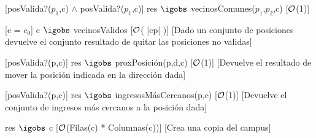 \begin{Interfaz}
	[posValida?($p_1$,c) $\land$ posValida?($p_1$,c)]
	{res $\igobs$ vecinosComunes($p_1$,$p_2$,c)}
	[$\mathcal{O}$(1)]
	
	[c = $c_0$]
	{c $\igobs$ vecinosValidos}
	[$\mathcal{O}$( |cp| )]
	[Dado un conjunto de posiciones devuelve el conjunto resultado de quitar las posiciones no validas]
	
	[posValida?(p,c)]
	{res $\igobs$ proxPosición(p,d,c)}
	[$\mathcal{O}$(1)]
	[Devuelve el resultado de mover la posición indicada en la dirección dada]
		
	[posValida?(p,c)]
	{res $\igobs$ ingresosMásCercanos(p,c)}
	[$\mathcal{O}$(1)]
	[Devuelve el conjunto de ingresos más cercanos a la posición dada]
	
	{res $\igobs$ c}
	[$\mathcal{O}$(Filas(c) * Columnas(c))]
	[Crea una copia del campus]
				
\end{Interfaz}

